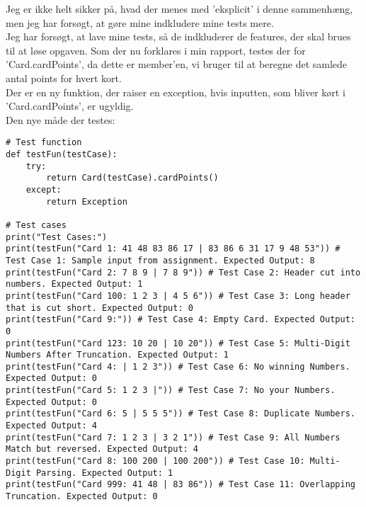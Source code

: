 \documentclass[a4paper,12pt]{article}
\begin{document}
Jeg er ikke helt sikker på, hvad der menes med 'eksplicit' i denne sammenhæng, men jeg har forsøgt, at gøre mine indkludere mine tests mere.\\
Jeg har forsøgt, at lave mine tests, så de indkluderer de features, der skal brues til at løse opgaven. Som der nu forklares i min rapport, testes der for 'Card.cardPoints', da dette er member'en, vi bruger til at beregne det samlede antal points for hvert kort.\\
Der er en ny funktion, der raiser en exception, hvis inputten, som bliver kørt i 'Card.cardPoints', er ugyldig.\\
Den nye måde der testes:

\begin{lstlisting}
# Test function
def testFun(testCase):
    try:
        return Card(testCase).cardPoints()
    except:
        return Exception
    
# Test cases
print("Test Cases:")
print(testFun("Card 1: 41 48 83 86 17 | 83 86 6 31 17 9 48 53")) # Test Case 1: Sample input from assignment. Expected Output: 8
print(testFun("Card 2: 7 8 9 | 7 8 9")) # Test Case 2: Header cut into numbers. Expected Output: 1
print(testFun("Card 100: 1 2 3 | 4 5 6")) # Test Case 3: Long header that is cut short. Expected Output: 0
print(testFun("Card 9:")) # Test Case 4: Empty Card. Expected Output: 0
print(testFun("Card 123: 10 20 | 10 20")) # Test Case 5: Multi-Digit Numbers After Truncation. Expected Output: 1
print(testFun("Card 4: | 1 2 3")) # Test Case 6: No winning Numbers. Expected Output: 0
print(testFun("Card 5: 1 2 3 |")) # Test Case 7: No your Numbers. Expected Output: 0
print(testFun("Card 6: 5 | 5 5 5")) # Test Case 8: Duplicate Numbers. Expected Output: 4
print(testFun("Card 7: 1 2 3 | 3 2 1")) # Test Case 9: All Numbers Match but reversed. Expected Output: 4
print(testFun("Card 8: 100 200 | 100 200")) # Test Case 10: Multi-Digit Parsing. Expected Output: 1
print(testFun("Card 999: 41 48 | 83 86")) # Test Case 11: Overlapping Truncation. Expected Output: 0
\end{lstlisting}
\end{document}
